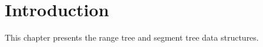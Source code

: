 \def\ccTagRmEigenClassName{\ccFalse}
\def\ccLongParamLayout{\ccTrue}

\ccThreeToTwo






\minitoc

\section{Introduction}

This chapter presents the {\cgal} range tree and segment tree
data structures. 








